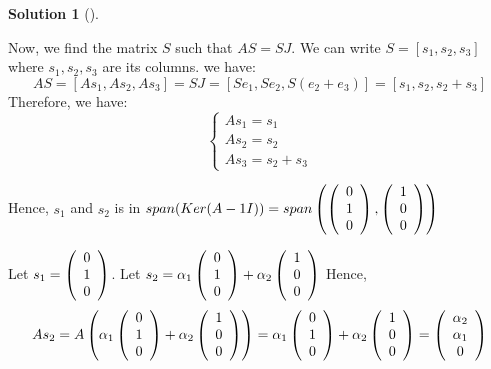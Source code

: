 \documentclass[numbers=enddot,12pt,final,onecolumn,notitlepage]{scrartcl}
\newcounter{sol}
\theoremstyle{definition}
\newtheorem{solu}[sol]{Solution}
\newenvironment{solution}[1][]
{\begin{solu}[#1]\begin{leftbar}}
        {\end{leftbar}\end{solu}}
\begin{document}
\begin{solution}
	Now, we find the matrix $S$ such that $AS = SJ$. We can write $S = [s_1, s_2, s_3]$ where $s_1, s_2, s_3$ are its columns. we have:
	\[
		AS = [As_1, As_2, As_3] = SJ = [Se_1, Se_2, S(e_2 + e_3)] = [s_1, s_2, s_2 + s_3]
	\]
	Therefore, we have:
	\[
		\begin{cases}
			As_1 = s_1 \\
			As_2 = s_2 \\
			As_3 = s_2 + s_3
		\end{cases}
	\]

	Hence, $s_1$ and $s_2$ is in $span(Ker(A - 1 I)) = span\left(
		\left(\begin{array}
					[c]{c}
					0 \\
					1 \\
					0
				\end{array}\right),
		\left(\begin{array}
					[c]{c}
					1 \\
					0 \\
					0
				\end{array}\right)
		\right)
	$

	Let $s_1 =
		\left(\begin{array}
				[c]{c}
				0 \\
				1 \\
				0
			\end{array}\right)$. Let $s_2 =
		\alpha_1\left(\begin{array}
				[c]{c}
				0 \\
				1 \\
				0
			\end{array}\right) +
		\alpha_2\left(\begin{array}
				[c]{c}
				1 \\
				0 \\
				0
			\end{array}\right)$
	Hence,
	\[
		As_2 = A\left(
		\alpha_1\left(\begin{array}
					[c]{c}
					0 \\
					1 \\
					0
				\end{array}\right) +
		\alpha_2\left(\begin{array}
					[c]{c}
					1 \\
					0 \\
					0
				\end{array}\right)
		\right) =
		\alpha_1\left(\begin{array}
				[c]{c}
				0 \\
				1 \\
				0
			\end{array}\right) +
		\alpha_2\left(\begin{array}
				[c]{c}
				1 \\
				0 \\
				0
			\end{array}\right) =
		\left(\begin{array}
				[c]{c}
				\alpha_2 \\
				\alpha_1 \\
				0
			\end{array}\right)
	\]


\end{solution}
\end{document}
